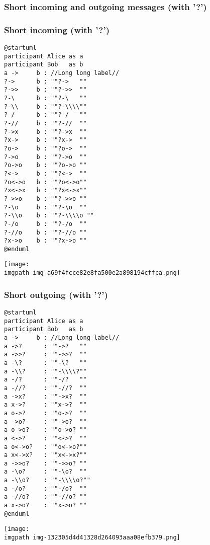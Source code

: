 \subsubsection{Short incoming and outgoing messages (with '?')}
\subsubsection{Short incoming (with '?')}
\begin{verbatim}
@startuml
participant Alice as a
participant Bob   as b
a ->     b : //Long long label//
?->      b : ""?->   ""
?->>     b : ""?->>  ""
?-\      b : ""?-\   ""
?-\\     b : ""?-\\\\""
?-/      b : ""?-/   ""
?-//     b : ""?-//  ""
?->x     b : ""?->x  ""
?x->     b : ""?x->  ""
?o->     b : ""?o->  ""
?->o     b : ""?->o  ""
?o->o    b : ""?o->o ""
?<->     b : ""?<->  ""
?o<->o   b : ""?o<->o""
?x<->x   b : ""?x<->x""
?->>o    b : ""?->>o ""
?-\o     b : ""?-\o  ""
?-\\o    b : ""?-\\\\o ""
?-/o     b : ""?-/o  ""
?-//o    b : ""?-//o ""
?x->o    b : ""?x->o ""
@enduml
\end{verbatim}
\begin{center}
\texttt{[image: \\imgpath img-a69f4fcce82e8fa500e2a898194cffca.png]}
\end{center}


\subsubsection{Short outgoing (with '?')}
\begin{verbatim}
@startuml
participant Alice as a
participant Bob   as b
a ->     b : //Long long label//
a ->?      : ""->?   ""
a ->>?     : ""->>?  ""
a -\?      : ""-\?   ""
a -\\?     : ""-\\\\?""
a -/?      : ""-/?   ""
a -//?     : ""-//?  ""
a ->x?     : ""->x?  ""
a x->?     : ""x->?  ""
a o->?     : ""o->?  ""
a ->o?     : ""->o?  ""
a o->o?    : ""o->o? ""
a <->?     : ""<->?  ""
a o<->o?   : ""o<->o?""
a x<->x?   : ""x<->x?""
a ->>o?    : ""->>o? ""
a -\o?     : ""-\o?  ""
a -\\o?    : ""-\\\\o?""
a -/o?     : ""-/o?  ""
a -//o?    : ""-//o? ""
a x->o?    : ""x->o? ""
@enduml
\end{verbatim}
\begin{center}
\texttt{[image: \\imgpath img-132305d4d41328d264093aaa08efb379.png]}
\end{center}
%
%
